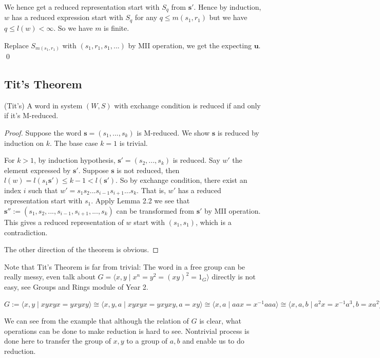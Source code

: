 We hence get a reduced representation start with $S_q$ from $\mathbf{s'}$. Hence by induction, $w$ has a reduced expression start with $S_q$ for any $q \le m(s_1,r_1)$ but we have $q \le l(w) < \infty$. So we have $m$ is finite. 

Replace $S_{m(s_1,r_1)}$ with $(s_1,r_1,s_1,...)$ by MII operation, we get the expecting $\mathbf{u}$. \qed 

\subsection{Tit's Theorem}
\begin{theorem}(Tit's)
    A word in system $(W,S)$ with exchange condition is reduced if and only if it's M-reduced. 
\end{theorem} 

\begin{proof}
    Suppose the word $\mathbf{s}=(s_1,...,s_k)$ is M-reduced. We show $\mathbf{s}$ is reduced by induction on $k$. The base case $k=1$ is trivial. 

For $k>1$, by induction hypothesis, $\mathbf{s'}=(s_2,...,s_k)$ is reduced. Say $w'$ the element expressed by $\mathbf{s'}$. Suppose $\mathbf{s}$ is not reduced, then $l(w)=l(s_1\mathbf{s'})\le k-1 < l(\mathbf{s'})$. So by exchange condition, there exist an index $i$ such that $w'=s_1s_2...s_{i-1}s_{i+1}...s_k$. That is, $w'$ has a reduced representation start with $s_1$. Apply Lemma 2.2 we see that $\mathbf{s''}:=(s_1,s_2,...,s_{i-1},s_{i+1},...,s_k)$ can be transformed from $\mathbf{s'}$ by MII operation. This gives a reduced representation of $w$ start with $(s_1,s_1)$, which is a contradiction. 

The other direction of the theorem is obvious.
\end{proof}


Note that Tit's Theorem is far from trivial: The word in a free group can be really messy, even talk about $G=\langle x,y \mid x^n=y^2=(xy)^2=1_G \rangle$ directly is not easy, see Groups and Rings module of Year 2. 


\begin{example}
    $G:=\langle x,y \mid xyxyx=yxyxy \rangle \cong \langle x,y,a \mid xyxyx=yxyxy,a=xy\rangle \cong \langle x,a \mid aax=x^{-1} aaa\rangle \cong \langle x,a,b \mid a^2x=x^{-1}a^3,b=xa^2\rangle \cong \langle a,b \mid a^2=b^5\rangle$
\end{example} 

We can see from the example that although the relation of $G$ is clear, what operations can be done to make reduction is hard to see. Nontrivial process is done here to transfer the group of $x,y$ to a group of $a,b$ and enable us to do reduction.

